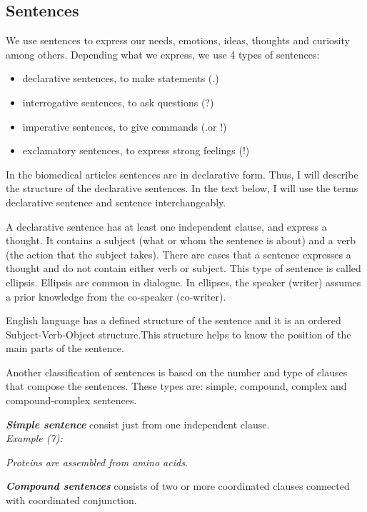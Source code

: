 \subsection{Sentences}

We use sentences to express our needs, emotions, ideas, thoughts and curiosity among others. Depending what we express, we use 4 types of sentences:
\begin{itemize}
	\item declarative sentences, to make statements (.)
	\item interrogative sentences, to ask questions (?)
	\item imperative sentences, to give commands (.or !)
	\item exclamatory sentences, to express strong feelings (!)
\end{itemize}

In the biomedical articles sentences are in declarative form. Thus, I will describe the structure of the declarative sentences. In the text below, I will use the terms declarative sentence and sentence interchangeably.

A declarative sentence has at least one independent clause, and express a thought. It contains a subject (what or whom the sentence is about) and a verb (the action that the subject takes). There are cases that a sentence expresses a thought and do not contain either verb or subject. This type of sentence is called ellipsis. Ellipsis are common in dialogue. In ellipses, the speaker (writer) assumes a prior knowledge from the co-speaker (co-writer).

English language has a defined structure of the sentence and it is an ordered Subject-Verb-Object structure.This structure helps to know the position of the main parts of the sentence.

Another classification of sentences is based on the number and type of clauses that compose the sentences. These types are: simple, compound, complex and compound-complex sentences.

\emph{\textbf{Simple sentence}} consist just from one independent clause.\\

\emph{Example (7):}
\begin{changemargin}{10mm}{10mm}
   \emph{Proteins are assembled from amino acids.}
\end{changemargin}
\vspace{3mm}

\emph{\textbf{Compound sentences}} consists of two or more coordinated clauses connected with coordinated conjunction.\\

